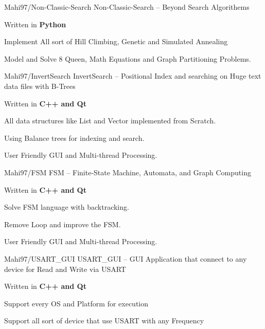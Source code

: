\begin{cventries}
    
    \cventry
    {Mahi97/Non-Classic-Search} %
    {Non-Classic-Search -- Beyond Search Algorithems} %
    {} %
    {} %
    {
      \begin{cvitems} %
         \item {Written in \textbf{Python}}
        \item {Implement All sort of Hill Climbing, Genetic and Simulated Annealing}
        \item {Model and Solve 8 Queen, Math Equations and Graph Partitioning Problems.}
      \end{cvitems}
    }

    
    \cventry
    {Mahi97/InvertSearch} %
    {InvertSearch -- Positional Index and searching on Huge text data files with B-Trees} %
    {} %
    {} %
    {
      \begin{cvitems} %
        \item {Written in \textbf{C++ and Qt}}
        \item {All data structures like List and Vector implemented from Scratch.}
        \item {Using Balance trees for indexing and search.}
        \item {User Friendly GUI and Multi-thread Processing.}
      \end{cvitems}
    }
    
    \cventry
    {Mahi97/FSM} %
    {FSM -- Finite-State Machine, Automata, and Graph Computing} %
    {} %
    {} %
    {
      \begin{cvitems} %
        \item {Written in \textbf{C++ and Qt}}
        \item {Solve FSM language with backtracking.}
        \item {Remove Loop and improve the FSM.}
        \item {User Friendly GUI and Multi-thread Processing.}
      \end{cvitems}
    }

    
    \cventry
    {Mahi97/USART\_GUI} %
    {USART\_GUI -- GUI Application that connect to any device for Read and Write via USART} %
    {} %
    {} %
    {
      \begin{cvitems} %
        \item {Written in \textbf{C++ and Qt}}
        \item {Support every OS and Platform for execution}
        \item {Support all sort of device that use USART with any Frequency}
      \end{cvitems}
    }


\end{cventries}
